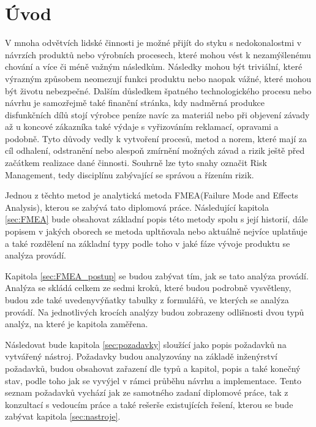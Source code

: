 \chapter{Úvod}
\label{sec:Uvod}
V mnoha odvětvích lidské činnosti je možné přijít do styku s nedokonalostmi v návrzích produktů nebo výrobních procesech, které mohou vést k nezamýšlenému chování a více či méně važným následkům. Následky mohou být triviální, které výrazným způsobem neomezují funkci produktu nebo naopak vážné, které mohou být životu nebezpečné. Dalším důsledkem špatného technologického procesu nebo návrhu je samozřejmě také finanční stránka, kdy nadměrná produkce disfunkčních dílů stojí výrobce peníze navíc za materiál nebo při objevení závady až u koncové zákazníka také výdaje s vyřizováním reklamací, opravami a podobně. Tyto důvody vedly k vytvoření procesů, metod a norem, které mají za cíl odhalení, odstranění nebo alespoň zmírnění možných závad a rizik ještě před začátkem realizace dané činnosti. Souhrně lze tyto snahy označit Risk Management, tedy disciplínu zabývající se správou a řízením rizik. 

Jednou z těchto metod je analytická metoda FMEA(Failure Mode and Effects Analysis), kterou se zabývá tato diplomová práce. Následující kapitola  \ref{sec:FMEA} bude obsahovat základní popis této metody spolu s její historií, dále popisem v jakých oborech se metoda upltňovala nebo aktuálně nejvíce uplatňuje a také rozdělení na základní typy podle toho v jaké fáze vývoje produktu se analýza provádí.

Kapitola \ref{sec:FMEA_postup} se budou zabývat tím, jak se tato analýza provádí. Analýza se skládá celkem ze sedmi kroků, které budou podrobně vysvětleny, budou zde také uvedenyvýňatky tabulky z formulářů, ve kterých se analýza provádí. Na jednotlivých krocích analýzy budou zobrazeny odlišnosti dvou typů analýz, na které je kapitola zaměřena.

Následovat bude kapitola \ref{sec:pozadavky} sloužící jako popis požadavků na vytvářený nástroj. Požadavky budou analyzovány na základě inženýrství požadavků, budou obsahovat zařazení dle typů a kapitol, popis a také konečný stav, podle toho jak se vyvýjel v rámci průběhu návrhu a implementace. Tento seznam požadavků vychází jak ze samotného zadaní diplomové práce, tak z konzultací s vedoucím práce a také rešerše existujících řešení, kterou se bude zabývat kapitola \ref{sec:nastroje}. 



\endinput
